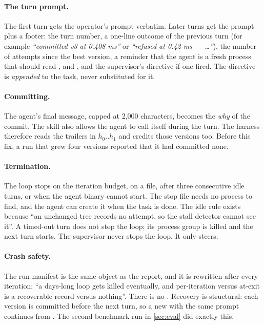 \paragraph{The turn prompt.} The first turn gets the operator's prompt verbatim. Later turns get the
prompt plus a footer: the turn number, a one-line outcome of the previous turn (for example
\emph{``committed v3 at 0.408 ms''} or \emph{``refused at 0.42 ms --- \ldots''}), the number of
attempts since the best version, a reminder that the agent is a fresh process that should read
,  and , and the supervisor's directive if one fired. The
directive is \emph{appended} to the task, never substituted for it.

\paragraph{Committing.} The agent's final message, capped at 2{,}000 characters, becomes the
\emph{why} of the commit. The skill also allows the agent to call  itself during the
turn. The harness therefore reads the trailers in $h_0..h_1$ and credits those versions too. Before
this fix, a run that grew four versions reported that it had committed none.

\paragraph{Termination.} The loop stops on the iteration budget, on a  file, after
three consecutive idle turns, or when the agent binary cannot start. The stop file needs no process
to find, and the agent can create it when the task is done. The idle rule exists because ``an
unchanged tree records no attempt, so the stall detector cannot see it''. A timed-out turn does not
stop the loop; its process group is killed and the next turn starts. The supervisor never stops the
loop. It only steers.

\paragraph{Crash safety.} The run manifest is the same object as the  report, and it is
rewritten after every iteration: ``a days-long loop gets killed eventually, and per-iteration versus
at-exit is a recoverable record versus nothing''. There is no . Recovery is structural:
each version is committed before the next turn, so a new  with the same prompt continues
from . The second benchmark run in \cref{sec:eval} did exactly this.

